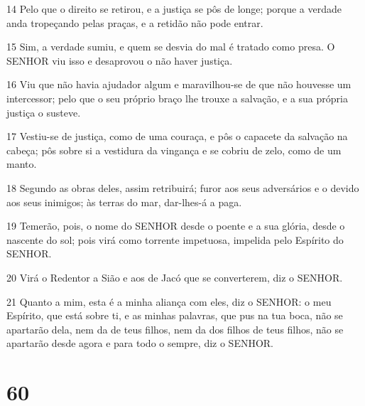 \par 14 Pelo que o direito se retirou, e a justiça se pôs de longe; porque a verdade anda tropeçando pelas praças, e a retidão não pode entrar.
\par 15 Sim, a verdade sumiu, e quem se desvia do mal é tratado como presa. O SENHOR viu isso e desaprovou o não haver justiça.
\par 16 Viu que não havia ajudador algum e maravilhou-se de que não houvesse um intercessor; pelo que o seu próprio braço lhe trouxe a salvação, e a sua própria justiça o susteve.
\par 17 Vestiu-se de justiça, como de uma couraça, e pôs o capacete da salvação na cabeça; pôs sobre si a vestidura da vingança e se cobriu de zelo, como de um manto.
\par 18 Segundo as obras deles, assim retribuirá; furor aos seus adversários e o devido aos seus inimigos; às terras do mar, dar-lhes-á a paga.
\par 19 Temerão, pois, o nome do SENHOR desde o poente e a sua glória, desde o nascente do sol; pois virá como torrente impetuosa, impelida pelo Espírito do SENHOR.
\par 20 Virá o Redentor a Sião e aos de Jacó que se converterem, diz o SENHOR.
\par 21 Quanto a mim, esta é a minha aliança com eles, diz o SENHOR: o meu Espírito, que está sobre ti, e as minhas palavras, que pus na tua boca, não se apartarão dela, nem da de teus filhos, nem da dos filhos de teus filhos, não se apartarão desde agora e para todo o sempre, diz o SENHOR.

\chapter{60}

